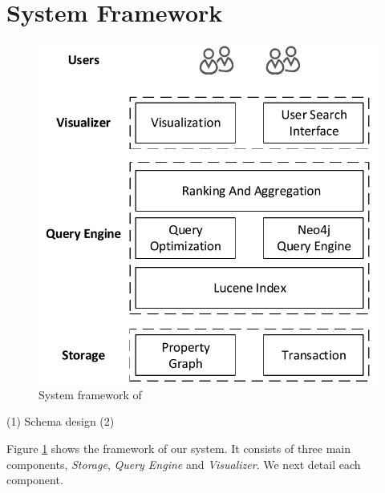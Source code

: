 \section{System Framework}
\label{sec-system}

\begin{figure}
\centering
\includegraphics[width=0.5\columnwidth]{systemFrame.pdf}
\caption{System framework of \oursystem}
\label{fig:frame}
\vspace{-2ex}
\end{figure}

(1) Schema design
(2) 


Figure \ref{fig:frame} shows the framework of our \oursystem system. It consists of three main components, \emph{Storage}, \emph{Query Engine} and \emph{Visualizer}. We next detail each component. 






